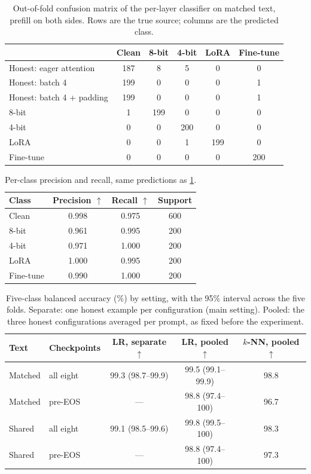 \documentclass[10pt,twocolumn]{article}
\newcommand{\best}[1]{\cellcolor{blue!8}#1}
\newcommand{\up}{$\uparrow$}
\begin{document}
\begin{table}[!t]
\centering
\small
\caption{Out-of-fold confusion matrix of the per-layer classifier on matched text, prefill on both sides. Rows are the true source; columns are the predicted class.}
\label{tab:confusion}
\begin{tabular}{@{}lccccc@{}}
\toprule
 & Clean & 8-bit & 4-bit & LoRA & Fine-tune \\
\midrule
Honest: eager attention   & \best{187} & 8 & 5 & 0 & 0 \\
Honest: batch 4           & \best{199} & 0 & 0 & 0 & 1 \\
Honest: batch 4 + padding & \best{199} & 0 & 0 & 0 & 1 \\
8-bit                     & 1 & \best{199} & 0 & 0 & 0 \\
4-bit                     & 0 & 0 & \best{200} & 0 & 0 \\
LoRA                      & 0 & 0 & 1 & \best{199} & 0 \\
Fine-tune                 & 0 & 0 & 0 & 0 & \best{200} \\
\bottomrule
\end{tabular}
\end{table}

\begin{table}[!htb]
\centering
\small
\caption{Per-class precision and recall, same predictions as \cref{tab:confusion}.}
\label{tab:perclass}
\begin{tabular}{@{}lccc@{}}
\toprule
Class & Precision \up & Recall \up & Support \\
\midrule
Clean     & 0.998 & 0.975 & 600 \\
8-bit     & 0.961 & 0.995 & 200 \\
4-bit     & 0.971 & 1.000 & 200 \\
LoRA      & 1.000 & 0.995 & 200 \\
Fine-tune & 0.990 & 1.000 & 200 \\
\bottomrule
\end{tabular}
\end{table}

\begin{table}[!t]
\centering
\small
\caption{Five-class balanced accuracy (\%) by setting, with the 95\% interval across the five folds. Separate: one honest example per configuration (main setting). Pooled: the three honest configurations averaged per prompt, as fixed before the experiment.}
\label{tab:configs}
\begin{tabular}{@{}llccc@{}}
\toprule
Text & Checkpoints & LR, separate \up & LR, pooled \up & $k$-NN, pooled \up \\
\midrule
Matched & all eight & \best{99.3} {\scriptsize(98.7--99.9)} & 99.5 {\scriptsize(99.1--99.9)} & 98.8 \\
Matched & pre-EOS   & ---  & 98.8 {\scriptsize(97.4--100)} & 96.7 \\
Shared  & all eight & 99.1 {\scriptsize(98.5--99.6)} & 99.8 {\scriptsize(99.5--100)} & 98.3 \\
Shared  & pre-EOS   & ---  & 98.8 {\scriptsize(97.4--100)} & 97.3 \\
\bottomrule
\end{tabular}
\end{table}
\end{document}
